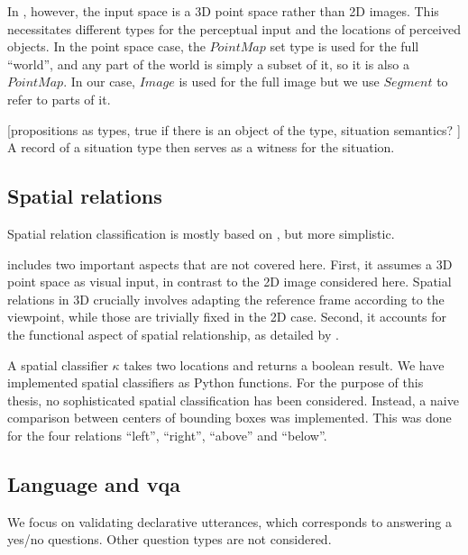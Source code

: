 In \cite{lspc}, however, the input space is a 3D point space rather than 2D images.
This necessitates different types for the perceptual input and the locations of perceived objects.
In the point space case, the $PointMap$ set type is used for the full ``world'', and any part of the world is simply a subset of it, so it is also a $PointMap$.
In our case, $Image$ is used for the full image but we use $Segment$ to refer to parts of it.

[propositions as types, true if there is an object of the type, situation semantics? \cite{BarwiseSituationsAttitudes1981}]
A record of a situation type then serves as a witness for the situation.



\subsection{Spatial relations}

Spatial relation classification is mostly based on \cite{ttrspat}, but more simplistic.

\cite{ttrspat} includes two important aspects that are not covered here.
First, it assumes a 3D point space as visual input, in contrast to the 2D image considered here.
Spatial relations in 3D crucially involves adapting the reference frame according to the viewpoint, while those are trivially fixed in the 2D case.
Second, it accounts for the functional aspect of spatial relationship, as detailed by \cite{CoventryClassificationExtrageometricInfluences2004}.

A spatial classifier $\kappa$ takes two locations and returns a boolean result.
We have implemented spatial classifiers as Python functions.
For the purpose of this thesis, no sophisticated spatial classification has been considered.
Instead, a naive comparison between centers of bounding boxes was implemented.
This was done for the four relations ``left'', ``right'', ``above'' and ``below''.



\subsection{Language and \gls{vqa}}
\label{ssec:languagevqa}

We focus on validating declarative utterances, which corresponds to answering a yes/no questions.
Other question types are not considered.

